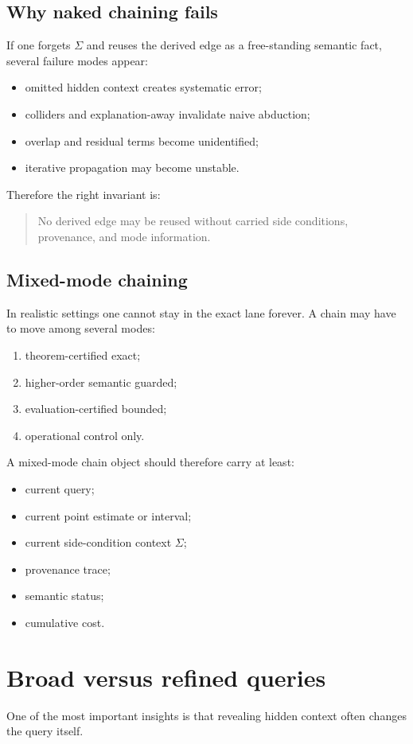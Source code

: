 \documentclass[11pt]{article}
\newcommand{\sigmactx}{\Sigma}
\begin{document}
\subsection{Why naked chaining fails}
If one forgets $\sigmactx$ and reuses the derived edge as a free-standing semantic fact, several failure modes appear:
\begin{itemize}
    \item omitted hidden context creates systematic error;
    \item colliders and explanation-away invalidate naive abduction;
    \item overlap and residual terms become unidentified;
    \item iterative propagation may become unstable.
\end{itemize}

Therefore the right invariant is:
\begin{quote}
No derived edge may be reused without carried side conditions, provenance, and mode information.
\end{quote}

\subsection{Mixed-mode chaining}
In realistic settings one cannot stay in the exact lane forever. A chain may have to move among several modes:
\begin{enumerate}[label=(\alph*)]
    \item theorem-certified exact;
    \item higher-order semantic guarded;
    \item evaluation-certified bounded;
    \item operational control only.
\end{enumerate}

A mixed-mode chain object should therefore carry at least:
\begin{itemize}
    \item current query;
    \item current point estimate or interval;
    \item current side-condition context $\sigmactx$;
    \item provenance trace;
    \item semantic status;
    \item cumulative cost.
\end{itemize}

\section{Broad versus refined queries}
One of the most important insights is that revealing hidden context often changes the query itself.
\end{document}
